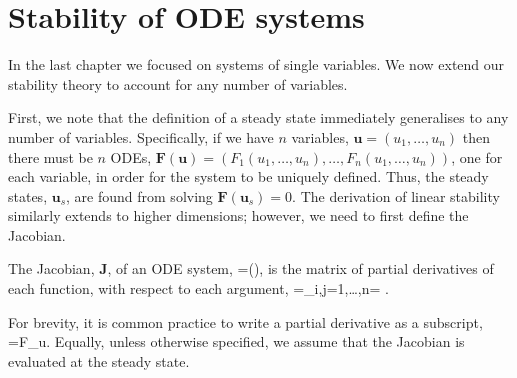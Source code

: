 \chapter{Stability of ODE systems}\label{Stability of ODE systems}
In the last chapter we focused on systems of single variables. We now extend our stability theory to account for any number of variables.

First, we note that the definition of a steady state immediately generalises to any number of variables. Specifically, if we have $n$ variables, $\bm{u}=(u_1,\dots,u_n)$ then there must be $n$ ODEs, $\bm{F}(\bm{u})=(F_1(u_1,\dots,u_n),\dots,F_n(u_1,\dots,u_n))$, one for each variable, in order for the system to be uniquely defined. Thus, the steady states, $\bm{u}_s$, are found from solving $\bm{F}(\bm{u}_s)=0$. The derivation of linear stability similarly extends to higher dimensions; however, we need to first define the Jacobian.
\begin{defin}
The Jacobian, $\bm{J}$, of an ODE system,
\bb
{}=(),
\ee
is the matrix of partial derivatives of each function, with respect to each argument,
\bb
{}=\left[ \D{F_i}{u_j}\right]_{i,j=1,\dots,n}= . 
\ee
\end{defin}
For brevity, it is common practice to write a partial derivative as a subscript, \ie
\bb
{}=F_u.
\ee
Equally, unless otherwise specified, we assume that the Jacobian is evaluated at the steady state.

